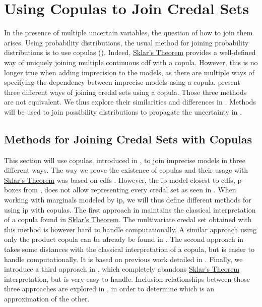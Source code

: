 \chapter{Using Copulas to Join Credal Sets}\label{chap:joining_credal_sets}
In the presence of multiple uncertain variables, the question of how to join them arises. Using probability distributions, the usual method for joining probability distributions is to use copulas (). Indeed, \hyperref[theorem:sklar]{Sklar's Theorem} provides a well-defined way of uniquely joining multiple continuous \acrshort{cdf} with a copula. However, this is no longer true when adding imprecision to the models, as there are multiple ways of specifying the dependency between imprecise models using a copula.  present three different ways of joining credal sets using a copula. Those three methods are not equivalent. We thus explore their similarities and differences in . Methods will be used to join possibility distributions to propagate the uncertainty in . 

\section{Methods for Joining Credal Sets with Copulas}\label{sec:methods_for_joining_credal_sets}
This section will use copulas, introduced in , to join imprecise models in three different ways. The way we prove the existence of copulas and their usage with \hyperref[theorem:sklar]{Sklar's Theorem} was based on \acrshort{cdf}s \cite{nelsen_introduction_2006}. However, the \acrshort{ip} model closest to \acrshort{cdf}s, p-boxes from , does not allow representing every credal set as seen in . When working with marginals modeled by \acrlong{ip}, we will thus define different methods for using \acrshort{ip} with copulas. The first approach in  maintains the classical interpretation of a copula found in \hyperref[theorem:sklar]{Sklar's Theorem}. The multivariate credal set obtained with this method is however hard to handle computationally. A similar approach using only the product copula can be already be found in \cite{couso_survey_2000}. The second approach in  takes some distances with the classical interpretation of a copula, but is easier to handle computationally. It is based on previous work detailed in \cite{ferson_dependence_2004}. Finally, we introduce a third approach in , which completely abandons \hyperref[theorem:sklar]{Sklar's Theorem} interpretation, but is very easy to handle. Inclusion relationships between those three approaches are explored in , in order to determine which is an approximation of the other.


